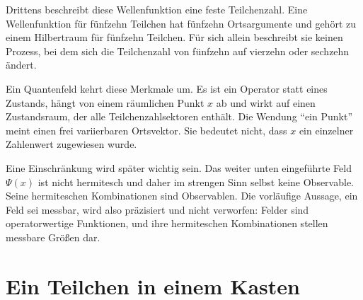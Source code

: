 Drittens beschreibt diese Wellenfunktion eine feste Teilchenzahl. Eine Wellenfunktion für fünfzehn Teilchen hat fünfzehn Ortsargumente und gehört zu einem Hilbertraum für fünfzehn Teilchen. Für sich allein beschreibt sie keinen Prozess, bei dem sich die Teilchenzahl von fünfzehn auf vierzehn oder sechzehn ändert.

Ein Quantenfeld kehrt diese Merkmale um. Es ist ein Operator statt eines Zustands, hängt von einem räumlichen Punkt \(x\) ab und wirkt auf einen Zustandsraum, der alle Teilchenzahlsektoren enthält. Die Wendung ``ein Punkt'' meint einen frei variierbaren Ortsvektor. Sie bedeutet nicht, dass \(x\) ein einzelner Zahlenwert zugewiesen wurde.

Eine Einschränkung wird später wichtig sein. Das weiter unten eingeführte Feld \(\Psi(x)\) ist nicht hermitesch und daher im strengen Sinn selbst keine Observable. Seine hermiteschen Kombinationen sind Observablen. Die vorläufige Aussage, ein Feld sei messbar, wird also präzisiert und nicht verworfen: Felder sind operatorwertige Funktionen, und ihre hermiteschen Kombinationen stellen messbare Größen dar.

\begin{classroomqa}
\end{classroomqa}

\begin{classroomqa}
\end{classroomqa}

\section{Ein Teilchen in einem Kasten}

